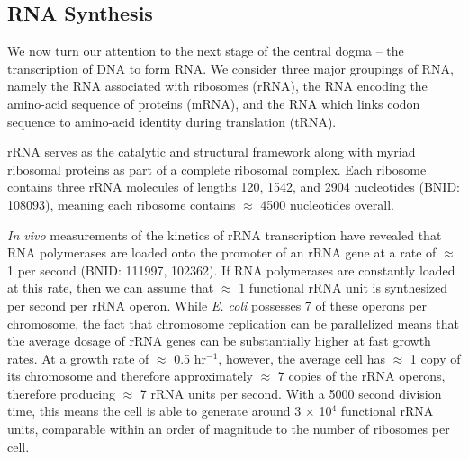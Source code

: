 \subsection{RNA Synthesis}\label{sec:RNA_synthesis}
We now turn our attention to the next stage of the central dogma -- the
transcription of DNA to form RNA. We consider three major groupings
of RNA, namely the RNA associated with ribosomes (rRNA), the RNA encoding the
amino-acid sequence of proteins (mRNA), and the RNA which links codon
sequence to amino-acid identity during translation (tRNA).

rRNA serves as the catalytic and structural
framework along with myriad ribosomal proteins as part of a complete ribosomal complex.
Each ribosome contains three rRNA molecules of lengths 120, 1542,
and 2904 nucleotides (BNID: 108093), meaning each ribosome
contains $\approx$ 4500 nucleotides overall.

\textit{In vivo} measurements of the kinetics of rRNA transcription have revealed that
RNA polymerases are loaded onto the promoter of an rRNA gene at a rate of
$\approx$ 1 per second (BNID: 111997, 102362). If RNA
polymerases are constantly loaded at this rate,
then we can assume that $\approx$ 1 functional rRNA unit is
synthesized per second per rRNA operon. While \textit{E. coli} possesses 7
of these operons per chromosome,
the fact that chromosome
replication can be parallelized means that the average dosage of rRNA genes can
be substantially higher at fast growth rates.
At a growth
rate of $\approx$ 0.5 hr$^{-1}$, however, the average cell has $\approx$ 1 copy of its
chromosome and therefore approximately $\approx$ 7 copies of the rRNA operons,
therefore producing $\approx$ 7 rRNA units per second.
With a 5000 second division time, this means the cell is able to generate around
3 $\times$ 10$^4$ functional rRNA units, comparable within an order of magnitude
to the number of ribosomes per cell.


